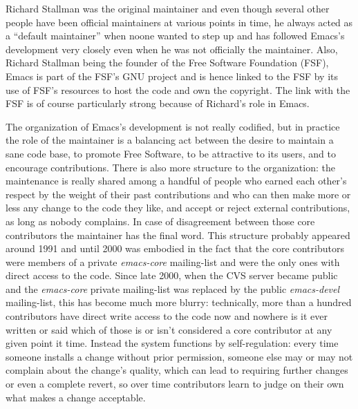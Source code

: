\documentclass[format=acmsmall, review]{acmart}
\begin{document}
Richard Stallman was the original maintainer and even though several other
people have been official maintainers at various points in time, he always
acted as a ``default maintainer'' when noone wanted to step up and has
followed Emacs's development very closely even when he was not officially
the maintainer.  Also, Richard Stallman being the founder of the Free
Software Foundation (FSF), Emacs is part of the FSF's GNU project and is
hence linked to the FSF by its use of FSF's resources to host the code and
own the copyright.  The link with the FSF is of course particularly strong
because of Richard's role in Emacs.

The organization of Emacs's development is not really codified, but in
practice the role of the maintainer is a balancing act between the desire to
maintain a sane code base, to promote Free Software, to be attractive to its
users, and to encourage contributions.  There is also more structure to the
organization: the maintenance is really shared among a handful of people who
earned each other's respect by the weight of their past contributions and
who can then make more or less any change to the code they like, and accept
or reject external contributions, as long as nobody complains.  In case of
disagreement between those core contributors the maintainer has the final
word.  This structure probably appeared around 1991 and until 2000 was
embodied in the fact that the core contributors were members of a private
\emph{emacs-core} mailing-list and were the only ones with direct access to
the code.  Since late 2000, when the CVS server became public and the
\emph{emacs-core} private mailing-list was replaced by the public
\emph{emacs-devel} mailing-list, this has become much more blurry:
technically, more than a hundred contributors have direct write access to
the code now and nowhere is it ever written or said which of those is or
isn't considered a core contributor at any given point it time.  Instead the
system functions by self-regulation: every time someone installs a change
without prior permission, someone else may or may not complain about the
change's quality, which can lead to requiring further changes or even
a complete revert, so over time contributors learn to judge on their own
what makes a change acceptable.
\end{document}
